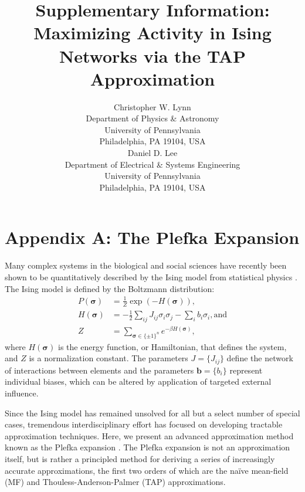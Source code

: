 \documentclass[letterpaper]{article} %
\begin{document}
%
\title{Supplementary Information: Maximizing Activity in Ising Networks via the TAP Approximation}
\author{Christopher W. Lynn \\
Department of Physics \& Astronomy \\
University of Pennsylvania \\
Philadelphia, PA 19104, USA \\
\And Daniel D. Lee \\
Department of Electrical \& Systems Engineering \\
University of Pennsylvania \\
Philadelphia, PA 19104, USA}

\maketitle

\section{Appendix A: The Plefka Expansion}

Many complex systems in the biological and social sciences have recently been shown to be quantitatively described by the Ising model from statistical physics \cite{Schneidman-01,Ganmor-01,Lynn-03,Galam-02}. The Ising model is defined by the Boltzmann distribution:
\begin{align}
\label{Boltzmann}
P(\bm{\sigma}) &= \frac{1}{Z}\exp\left(- H(\bm{\sigma})\right), \\
H(\bm{\sigma}) &= -\frac{1}{2}\sum_{ij}J_{ij}\sigma_i\sigma_j - \sum_i b_i\sigma_i, \text{and} \\
Z &= \sum_{\bm{\sigma}\in \{\pm 1\}^n} e^{-\beta H(\bm{\sigma})},
\end{align}
where $H(\bm{\sigma})$ is the energy function, or Hamiltonian, that defines the system, and $Z$ is a normalization constant. The parameters $J = \{J_{ij}\}$ define the network of interactions between elements and the parameters $\bm{b} = \{b_i\}$ represent individual biases, which can be altered by application of targeted external influence.

Since the Ising model has remained unsolved for all but a select number of special cases, tremendous interdisciplinary effort has focused on developing tractable approximation techniques. Here, we present an advanced approximation method known as the Plefka expansion \cite{Yedidia-01}. The Plefka expansion is not an approximation itself, but is rather a principled method for deriving a series of increasingly accurate approximations, the first two orders of which are the na\"{i}ve mean-field (MF) and Thouless-Anderson-Palmer (TAP) approximations.
\end{document}
